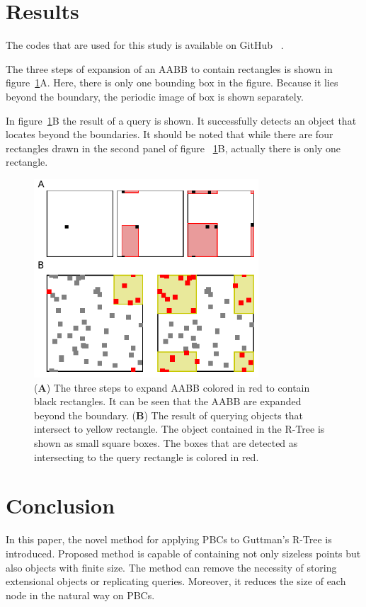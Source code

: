 \documentclass[10pt,letterpaper,twocolumn]{article}
\begin{document}
\section*{Results}

The codes that are used for this study is available on GitHub
~\cite{periortree-2017}.

The three steps of expansion of an AABB to contain rectangles is shown in
figure~\ref{fig-result}A.
Here, there is only one bounding box in the figure.
Because it lies beyond the boundary, the periodic image of box is shown separately.

In figure~\ref{fig-result}B the result of a query is shown. It successfully
detects an object that locates beyond the boundaries. It should be noted that
while there are four rectangles drawn in the second panel of figure
~\ref{fig-result}B, actually there is only one rectangle.

\begin{figure}[htb]
    \includegraphics[width=8.4cm, bb=4 6 237 212]{fig-result-expand-intersect.eps}
    \caption{
    (\textbf{A})
    The three steps to expand AABB colored in red to contain black rectangles.
    It can be seen that the AABB are expanded beyond the boundary.
    (\textbf{B})
    The result of querying objects that intersect to yellow rectangle.
    The object contained in the R-Tree is shown as small square boxes.
    The boxes that are detected as intersecting to the query rectangle is
    colored in red.
    }
    \label{fig-result}
\end{figure}

\section*{Conclusion}

In this paper, the novel method for applying PBCs to Guttman's R-Tree is
introduced. Proposed method is capable of containing not only sizeless points
but also objects with finite size. The method can remove the necessity of
storing extensional objects or replicating queries. Moreover, it reduces the
size of each node in the natural way on PBCs.
\end{document}
